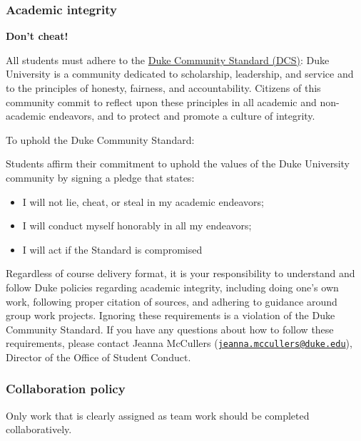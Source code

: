 \documentclass[
  letterpaper,
  DIV=11,
  numbers=noendperiod]{scrartcl}
\providecommand{\tightlist}{%
  \setlength{\itemsep}{0pt}\setlength{\parskip}{0pt}}
\begin{document}
\hypertarget{academic-integrity}{%
\subsubsection{Academic integrity}\label{academic-integrity}}

\textbf{Don't cheat!}

All students must adhere to the
\href{https://trinity.duke.edu/undergraduate/academic-policies/community-standard-student-conduct}{Duke
Community Standard (DCS)}: Duke University is a community dedicated to
scholarship, leadership, and service and to the principles of honesty,
fairness, and accountability. Citizens of this community commit to
reflect upon these principles in all academic and non-academic
endeavors, and to protect and promote a culture of integrity.

To uphold the Duke Community Standard:

Students affirm their commitment to uphold the values of the Duke
University community by signing a pledge that states:

\begin{itemize}
\tightlist
\item
  I will not lie, cheat, or steal in my academic endeavors;
\item
  I will conduct myself honorably in all my endeavors;
\item
  I will act if the Standard is compromised
\end{itemize}

Regardless of course delivery format, it is your responsibility to
understand and follow Duke policies regarding academic integrity,
including doing one's own work, following proper citation of sources,
and adhering to guidance around group work projects. Ignoring these
requirements is a violation of the Duke Community Standard. If you have
any questions about how to follow these requirements, please contact
Jeanna McCullers
(\href{mailto:jeanna.mccullers@duke.edu}{\nolinkurl{jeanna.mccullers@duke.edu}}),
Director of the Office of Student Conduct.

\hypertarget{collaboration-policy}{%
\subsubsection{Collaboration policy}\label{collaboration-policy}}

Only work that is clearly assigned as team work should be completed
collaboratively.
\end{document}
